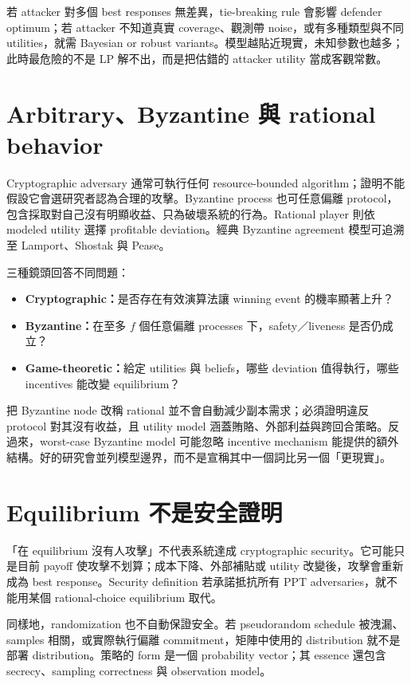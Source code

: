 \documentclass[11pt,a4paper,oneside,openany]{book}
\begin{document}
若 attacker 對多個 best responses 無差異，tie-breaking rule 會影響 defender optimum；若 attacker 不知道真實 coverage、觀測帶 noise，或有多種類型與不同 utilities，就需 Bayesian or robust variants。模型越貼近現實，未知參數也越多；此時最危險的不是 LP 解不出，而是把估錯的 attacker utility 當成客觀常數。

\section{Arbitrary、Byzantine 與 rational behavior}
Cryptographic adversary 通常可執行任何 resource-bounded algorithm；證明不能假設它會選研究者認為合理的攻擊。Byzantine process 也可任意偏離 protocol，包含採取對自己沒有明顯收益、只為破壞系統的行為。Rational player 則依 modeled utility 選擇 profitable deviation。經典 Byzantine agreement 模型可追溯至 Lamport、Shostak 與 Pease\cite{lamport-byzantine}。

三種鏡頭回答不同問題：
\begin{itemize}
\item \textbf{Cryptographic：}是否存在有效演算法讓 winning event 的機率顯著上升？
\item \textbf{Byzantine：}在至多 $f$ 個任意偏離 processes 下，safety／liveness 是否仍成立？
\item \textbf{Game-theoretic：}給定 utilities 與 beliefs，哪些 deviation 值得執行，哪些 incentives 能改變 equilibrium？
\end{itemize}

把 Byzantine node 改稱 rational 並不會自動減少副本需求；必須證明違反 protocol 對其沒有收益，且 utility model 涵蓋賄賂、外部利益與跨回合策略。反過來，worst-case Byzantine model 可能忽略 incentive mechanism 能提供的額外結構。好的研究會並列模型邊界，而不是宣稱其中一個詞比另一個「更現實」。

\section{Equilibrium 不是安全證明}
\begin{misconception}
「在 equilibrium 沒有人攻擊」不代表系統達成 cryptographic security。它可能只是目前 payoff 使攻擊不划算；成本下降、外部補貼或 utility 改變後，攻擊會重新成為 best response。Security definition 若承諾抵抗所有 PPT adversaries，就不能用某個 rational-choice equilibrium 取代。
\end{misconception}

同樣地，randomization 也不自動保證安全。若 pseudorandom schedule 被洩漏、samples 相關，或實際執行偏離 commitment，矩陣中使用的 distribution 就不是部署 distribution。策略的 form 是一個 probability vector；其 essence 還包含 secrecy、sampling correctness 與 observation model。
\end{document}

